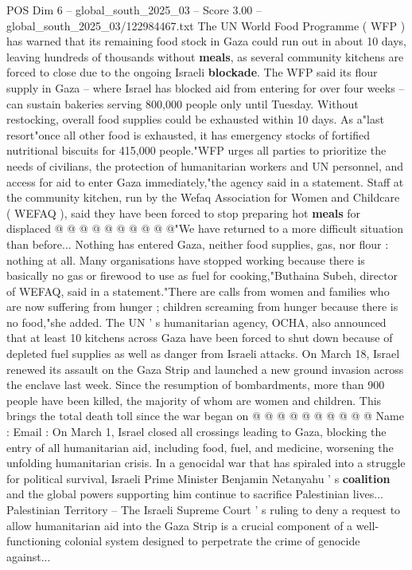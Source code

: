 \begin{textsample}{POS Dim 6 – global\_south\_2025\_03 – Score 3.00 – global\_south\_2025\_03/122984467.txt}  \label{ex:f6_pos_318}
The UN World Food Programme ( WFP ) has warned that its remaining food stock in Gaza could run out in about 10 days, leaving hundreds of thousands without \textbf{meals}, as several community kitchens are forced to close due to the ongoing Israeli \textbf{blockade}.
The WFP said its flour supply in Gaza -- where Israel has blocked aid from entering for over four weeks -- can sustain bakeries serving 800,000 people only until Tuesday.
Without restocking, overall food supplies could be exhausted within 10 days.
As a"last resort"once all other food is exhausted, it has emergency stocks of fortified nutritional biscuits for 415,000 people."WFP urges all parties to prioritize the needs of civilians, the protection of humanitarian workers and UN personnel, and access for aid to enter Gaza immediately,"the agency said in a statement.
Staff at the community kitchen, run by the Wefaq Association for Women and Childcare ( WEFAQ ), said they have been forced to stop preparing hot \textbf{meals} for displaced @ @ @ @ @ @ @ @ @ @"We have returned to a more difficult situation than before...
Nothing has entered Gaza, neither food supplies, gas, nor flour : nothing at all.
Many organisations have stopped working because there is basically no gas or firewood to use as fuel for cooking,"Buthaina Subeh, director of WEFAQ, said in a statement."There are calls from women and families who are now suffering from hunger ; children screaming from hunger because there is no food,"she added.
The UN ' s humanitarian agency, OCHA, also announced that at least 10 kitchens across Gaza have been forced to shut down because of depleted fuel supplies as well as danger from Israeli attacks.
On March 18, Israel renewed its assault on the Gaza Strip and launched a new ground invasion across the enclave last week.
Since the resumption of bombardments, more than 900 people have been killed, the majority of whom are women and children.
This brings the total death toll since the war began on @ @ @ @ @ @ @ @ @ @ Name : Email : On March 1, Israel closed all crossings leading to Gaza, blocking the entry of all humanitarian aid, including food, fuel, and medicine, worsening the unfolding humanitarian crisis.
In a genocidal war that has spiraled into a struggle for political survival, Israeli Prime Minister Benjamin Netanyahu ' s \textbf{coalition} and the global powers supporting him continue to sacrifice Palestinian lives...
Palestinian Territory -- The Israeli Supreme Court ' s ruling to deny a request to allow humanitarian aid into the Gaza Strip is a crucial component of a well-functioning colonial system designed to perpetrate the crime of genocide against...

\end{textsample}
